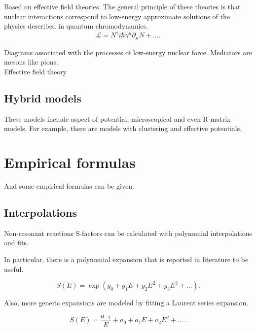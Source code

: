\documentclass[openany]{book}
\begin{document}
Based on effective field theories. The general principle of these theories is that nuclear interactions correspond to low-energy approximate solutions of the physics described in quantum chromodynamics. \\

\begin{equation} \label{eq:micro_lagrangian_nucleons}
	\mathcal{L} = N^{\dagger}i\hbar\gamma^\mu\partial_\mu N + ... .
\end{equation}

Diagrams associated with the processes of low-energy nuclear force. Mediators are mesons like pions. \\

Effective field theory \cite{sadeghi_khalili_godarzi_2013}
\cite{higa_premarathna_rupak_2022}

\subsection{Hybrid models} \label{sub:special_hybrid}

These models include aspect of potential, microscopical and even R-matrix models. For example, there are models with clustering and effective potentials.

\section{Empirical formulas} \label{sec:empiricalFormulas}

And some empirical formulas can be given. 

\subsection{Interpolations} \label{sub:empirical_interpolation}

Non-resonant reactions S-factors can be calculated with polynomial interpolations and fits. 

In particular, there is a polynomial expansion that is reported in literature to be useful. 

\begin{equation} \label{eq:empirical_exponential}
	S(E) = \exp{(g_0 + g_1E + g_2E^2 + g_3E^3 + ...)}.
\end{equation}

Also, more generic expansions are modeled by fitting a Laurent series expansion. 

\begin{equation}  \label{eq:empirical_laurent}
	S(E) =\frac{ a_{-1}}{E} + a_0 + a_1 E + a_2 E^2 + ... \ .
\end{equation}
\end{document}
